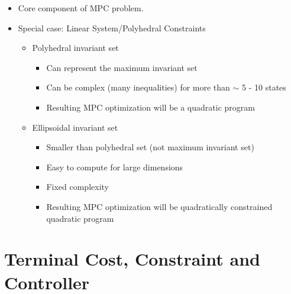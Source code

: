 \documentclass[8pt,a4paper]{scrartcl}
\begin{document}
\begin{multicols*}{3}
\begin{multicols*}{4}
{\begin{itemize}
\item Core component of MPC problem.
\item Special case: Linear System/Polyhedral Constraints
\begin{itemize}
\item Polyhedral invariant set
\begin{itemize}
\item Can represent the maximum invariant set
\item Can be complex (many inequalities) for more than $\sim$ 5 - 10 states
\item Resulting MPC optimization will be a quadratic program
\end{itemize}
\item Ellipsoidal invariant set
\begin{itemize}
\item Smaller than polyhedral set (not maximum invariant set)
\item Easy to compute for large dimensions
\item Fixed complexity
\item Resulting MPC optimization will be quadratically constrained quadratic program
\end{itemize}
\end{itemize}
\end{itemize}
}%

\section{Terminal Cost, Constraint and Controller}


\begin{itemize}


\end{itemize}
\end{multicols*}
\end{multicols*}
\end{document}
